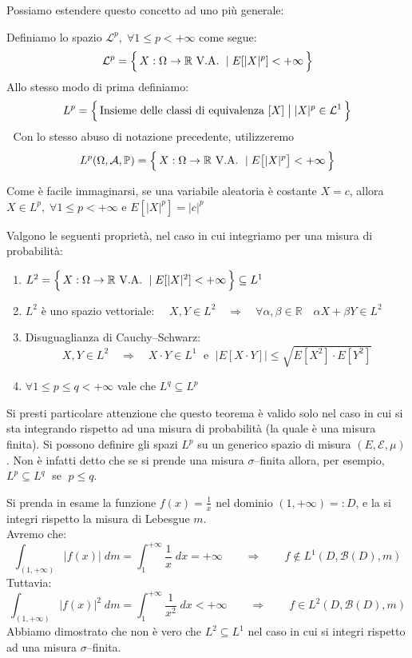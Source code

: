 \noindent Possiamo estendere questo concetto ad uno più generale:
\begin{definizione}
    Definiamo lo spazio $\mathcal{L}^p, \;\forall 1\leq p < +\infty$ come segue:
    \[\mathcal{L}^p = \Bigl\{\,X:\Omega\to\mathbb{R} \text{ V.A. }\mid E[|X|^p]<+\infty\,\Bigr\}\]
    Allo stesso modo di prima definiamo:
    \[L^p = \Bigl\{\,\text{Insieme delle classi di equivalenza }[X] \;\big|\; |X|^p\in \mathcal{L}^1\,\Bigr\}\]
    \faWarning $\;$ Con lo stesso abuso di notazione precedente, utilizzeremo
    \[L^p(\Omega, \mathcal{A}, \mathbb{P}) = \Bigl\{\,X:\Omega\to\mathbb{R} \text{ V.A. } \mid E\big[|X|^p\big]<+\infty\,\Bigr\}\]
\end{definizione}
Come è facile immaginarsi, se una variabile aleatoria è costante $X = c$, allora $X\in L^p, \;\forall1\leq p<+\infty$ e $E[|X|^p] = |c|^p$

\begin{teorema}
    Valgono le seguenti proprietà, nel caso in cui integriamo per una misura di probabilità:
    \begin{enumerate}
        \item $L^2 =  \Bigl\{\,X:\Omega\to\mathbb{R} \text{ V.A. }\mid E[|X|^2]<+\infty\,\Bigr\}\subseteq L^1$
        \item $L^2$ è  uno spazio vettoriale: $\quad X, Y\in L^2\quad \Rightarrow\quad \forall\alpha, \beta\in\mathbb{R}\quad \alpha X+\beta Y\in L^2$
        \item Disuguaglianza di Cauchy--Schwarz:\[X, Y\in L^2\quad \Rightarrow\quad X\cdot Y\in L^1\;\text{ e }\; \boxed{\big|E[X\cdot Y]\big|\leq \sqrt{E[X^2]\cdot E[Y^2]}}\]
        \item $\forall 1\leq p\leq q<+\infty$ vale che $L^q\subseteq L^p$
    \end{enumerate}
\end{teorema}

Si presti particolare attenzione che questo teorema è valido solo nel caso in cui si sta integrando rispetto ad una misura di probabilità (la quale è una misura finita). Si possono  definire gli spazi $L^p$ su un generico spazio di misura $(E, \mathcal{E}, \mu)$. Non è infatti detto che se si prende una misura $\sigma$--finita allora, per esempio, $L^p\subseteq L^q\;$ se $\;p\leq q$.

\begin{esempio}
    Si prenda in esame la funzione $f(x) = \frac{1}{x}$ nel dominio $(1, +\infty) =:D$, e la si integri rispetto la misura di Lebesgue $m$.\\
    Avremo che:
    \[\int_{(1, +\infty)} \left| f(x)\right|\;dm = \int_1^{+\infty}  \frac{1}{x}\;dx = +\infty \qquad \Rightarrow\qquad f\notin L^1(D, \mathcal{B}(D
    ), m)\]
    Tuttavia:
    \[\int_{(1, +\infty)} \left| f(x)\right|^2\;dm = \int_1^{+\infty}  \frac{1}{x^2}\;dx < +\infty \qquad \Rightarrow\qquad f\in L^2\left(D, \mathcal{B}(D
    ), m\right)\]
    Abbiamo dimostrato che non è vero che $L^2\subseteq L^1$ nel caso in cui si integri rispetto ad una misura $\sigma$--finita.
\end{esempio}

